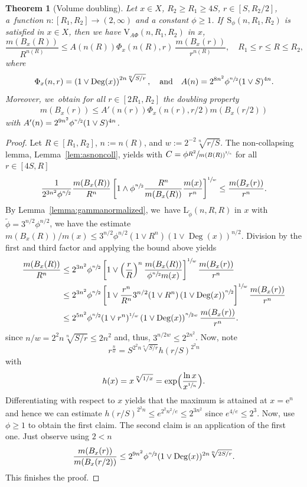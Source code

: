 \documentclass[JEP,XML,SOM,Unicode,published]{cedram}
\newcommand{\rS}{\mathrm{S}}
\newcommand{\rV}{\mathrm{V}}
\newcommand{\rL}{\mathrm{L}}
\theoremstyle{plain}
\newtheorem{theorem}{Theorem}[section]
\theoremstyle{definition}
\newcommand{\euler}{\mathrm{e}}
\DeclareMathOperator{\Deg}{Deg}
\begin{document}
\begin{theorem}[Volume doubling]\label{thm:adapteddoubling} Let $x\in X$, $R_2\geq R_1\geq 4S$, $r\in[S,R_2/2]$, a~function $n:[R_{1},R_{2}]\to (2,\infty)$ and a constant $\phi\geq 1$. If~$\rS_{\phi}(n,R_1,R_2)$ is satisfied in $x\in X$, then we have $\rV_{\!A\Phi}(n,R_1,R_2)$ in $x$, \ie
\[
\frac{m(B_x(R))}{R^{n(R)}}
\leq {A(n(R))} \Phi_x(n(R),r)\ \frac{m(B_x(r))}{r^{n(R)}}, \quad R_1\leq r\leq R\leq R_2,
\]
where
\[
\Phi_x(n,r)=\left(1\vee\Deg(x)\right)^{2n\sqrt[n]{S/r}},\quad\mbox{and}\quad A(n)=2^{8n^2}\phi^{\sfrac{n}{2}}(1\vee S)^{4n}.
\]
Moreover, we~obtain for all $r\in[2R_1,R_2]$ the doubling property
\begin{align*}
m(B_x(r))\leq {A'(n(r))} \Phi_x(n(r),r/2) m(B_{x}(r/2))
\end{align*}
with $ A'(n)=2^{9n^2}\phi^{\sfrac{n}{2}}(1\vee S)^{4n} $.
\end{theorem}

\begin{proof}
Let $R\in[R_1,R_2]$, $n:=n(R)$, and $w:=2^{-2}\sqrt[n]{r/S}$. The non-collapsing lemma, Lemma~\ref{lem:asnoncoll}, yields with $C=\phi\sfrac{R^{2}}{m(B(R))^{\sfrac{2}{n}}}$ for all $r\in [ 4S,R]$
\[
\frac{1}{2^{{3}n^2}\phi^{\sfrac{n}{2}}}\frac{m(B_x(R))}{R^{n}}
\left[1\wedge \phi^{\sfrac{n}{2}}\frac{R^{n}}{m(B_x(R))}\frac{m(x)}{r^{n}}\right] ^{\sfrac{1}{w}}
\leq \frac{m(B_x(r))}{r^{n}}.
\]
By Lemma~\ref{lemma:gammanormalized}, we~have $\rL_{\tilde\phi}(n,R,R)$ in $x$ with $\tilde \phi={3}^{n{/2}}\phi^{n{/2}}$, \ie we have the estimate ${{m(B_x(R))}/{m(x)}
\leq {3}^{n{/2}}\phi^{n/2}(1\vee R^n)\left(1\vee\Deg(x)\right)^{{n}/{2}}}$.
Division by the first and third factor and applying the bound above yields
\begin{align*}
\frac{m(B_x(R))}{R^{n}}
&\leq
2^{{3}n^2}
\phi^{\sfrac{n}{2}}
\left[1\vee \left(\frac{r}{R}\right)^{n} {\frac{m(B_x(R))}{\phi^{\sfrac{n}{2}}m(x)}}\right]^{\sfrac{1}{w}}\frac{m(B_x(r))}{r^{n}}
\\
&\leq
2^{{3}n^2}
\phi^{\sfrac{n}{2}}
\left[1\vee \frac{{r}^{n}}{R^{n}}
{3}^{n{/2}}(1\vee R^n)\left(1\vee\Deg(x)\right)^{\sfrac{n}{2}}
\right]^{\sfrac{1}{w}}\frac{m(B_x(r))}{r^{n}}
\\
&\leq
2^{{5}n^2}
\phi^{\sfrac{n}{2}} (1\vee r^n)^{\sfrac{1}{w}}
\left(1\vee\Deg(x)\right)
^{\sfrac{n}{2w}}\frac{m(B_x(r))}{r^{n}}.
\end{align*}
since $ n/w= 2^2n\sqrt[n]{S/r} \leq 2n^2$ and, thus, $ {3}^{n/{2}w} \leq 2^{2n^2}$.
Now, note
\[
r^{\frac{n}{w}}=S^{2^2n\sqrt[n]{S/r}}h(r/S)^{2^2n}
\]
with
\[
h(x)=x^{\sqrt[n]{1/x}}=\exp\Bigl(\frac{\ln x}{x^{\sfrac{1}{n}}}\Bigr).
\]
Differentiating with respect to $ x $ yields that the maximum is attained at $ x= \euler^{n}$ and hence we can estimate $ h(r/S)^{2^2n}\leq e^{2^2n^2/e}\leq 2^{3n^2} $ since $ e^{{4/e}}\leq 2^3 $. Now, use $\phi\geq 1$ to obtain the first claim.
The second claim is an application of the first one.
Just observe using $2<n$
\[
\frac
{m(B_x(r))}
{m(B_x(r/2))}\leq
2^{9n^2}\phi^{\sfrac{n}{2}}(1\vee\Deg(x))^{2n\sqrt[n]{2S/r}}.
\]
This finishes the proof.
\end{proof}
\end{document}
